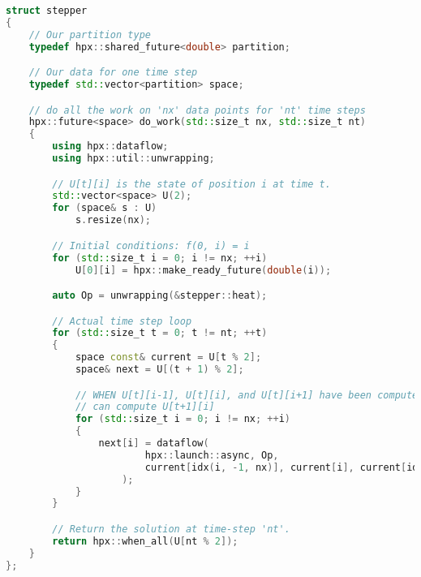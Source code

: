 \begin{lstlisting}[language=c++,caption={Futurized version of the one-dimensional heat equation.\label{code:hpx:future:ready}},float,floatplacement=tbp]
struct stepper
{
    // Our partition type
    typedef hpx::shared_future<double> partition;

    // Our data for one time step
    typedef std::vector<partition> space;

    // do all the work on 'nx' data points for 'nt' time steps
    hpx::future<space> do_work(std::size_t nx, std::size_t nt)
    {
        using hpx::dataflow;
        using hpx::util::unwrapping;

        // U[t][i] is the state of position i at time t.
        std::vector<space> U(2);
        for (space& s : U)
            s.resize(nx);

        // Initial conditions: f(0, i) = i
        for (std::size_t i = 0; i != nx; ++i)
            U[0][i] = hpx::make_ready_future(double(i));

        auto Op = unwrapping(&stepper::heat);

        // Actual time step loop
        for (std::size_t t = 0; t != nt; ++t)
        {
            space const& current = U[t % 2];
            space& next = U[(t + 1) % 2];

            // WHEN U[t][i-1], U[t][i], and U[t][i+1] have been computed, THEN we
            // can compute U[t+1][i]
            for (std::size_t i = 0; i != nx; ++i)
            {
                next[i] = dataflow(
                        hpx::launch::async, Op,
                        current[idx(i, -1, nx)], current[i], current[idx(i, +1, nx)]
                    );
            }
        }

        // Return the solution at time-step 'nt'.
        return hpx::when_all(U[nt % 2]);
    }
};
\end{lstlisting}


